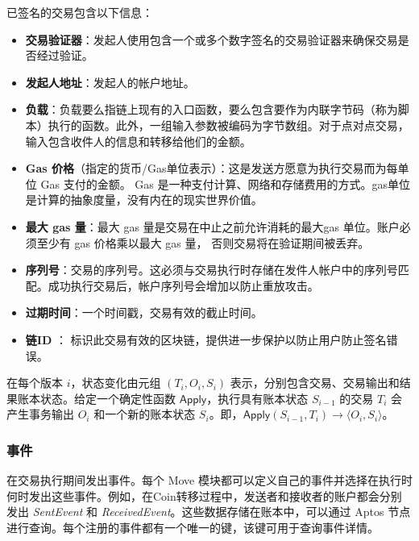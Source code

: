 \documentclass{article}
\begin{document}
已签名的交易包含以下信息： 

\begin{itemize}
\item \textbf{交易验证器}：发起人使用包含一个或多个数字签名的交易验证器来确保交易是否经过验证。 

\item \textbf{发起人地址}：发起人的帐户地址。 

\item \textbf{负载}：负载要么指链上现有的入口函数，要么包含要作为内联字节码（称为脚本）执行的函数。此外，一组输入参数被编码为字节数组。对于点对点交易，输入包含收件人的信息和转移给他们的金额。 

\item \textbf{Gas 价格}（指定的货币/Gas单位表示）：这是发送方愿意为执行交易而为每单位 Gas 支付的金额。 Gas 是一种支付计算、网络和存储费用的方式。gas单位是计算的抽象度量，没有内在的现实世界价值。 

\item \textbf{最大 gas 量}：最大 gas 量是交易在中止之前允许消耗的最大gas 单位。账户必须至少有 gas 价格乘以最大 gas 量， 否则交易将在验证期间被丢弃。 

\item \textbf{序列号}：交易的序列号。这必须与交易执行时存储在发件人帐户中的序列号匹配。成功执行交易后，帐户序列号会增加以防止重放攻击。 

\item \textbf{过期时间}：一个时间戳，交易有效的截止时间。 

\item \textbf{链ID} ： 标识此交易有效的区块链，提供进一步保护以防止用户防止签名错误。
\end{itemize}

在每个版本 $i$，状态变化由元组 $(T_i, O_i, S_i)$ 表示，分别包含交易、交易输出和结果账本状态。给定一个确定性函数 $\textsf{Apply}$，执行具有账本状态 $S_{i-1}$ 的交易 $T_i$ 会产生事务输出 $O_i$ 和一个新的账本状态 $S_i$。即，$\textsf{Apply}(S_{i-1}, T_i) \rightarrow \langle O_i, S_i\rangle$。

\subsubsection{事件}
\label{subsub:events}

在交易执行期间发出事件。每个 Move 模块都可以定义自己的事件并选择在执行时何时发出这些事件。例如，在Coin转移过程中，发送者和接收者的账户都会分别发出 \emph{SentEvent} 和 \emph{ReceivedEvent}。这些数据存储在账本中，可以通过 Aptos 节点进行查询。每个注册的事件都有一个唯一的键，该键可用于查询事件详情。 
\end{document}

